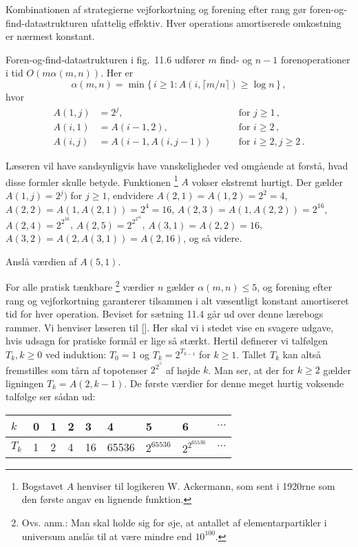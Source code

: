 Kombinationen af strategierne vejforkortning og forening efter rang gør foren-og-find-datastrukturen ufattelig effektiv.
Hver operations amortiserede omkostning er nærmest konstant.

\begin{thm}
Foren-og-find-datastrukturen i fig.~11.6 udfører $m$ find- og $n-1$ forenoperationer i tid $O(m\alpha(m,n))$.
Her er
\[ 
  \alpha(m,n) = \min\{\,i\geq 1\colon A(i,\lceil m/n\rceil)\geq \log n\,\}\,,
\]
hvor
  \begin{align*}
    A(1,j)&= 2^j,&\text{for } j\geq 1\,,\\
    A(i,1)&= A(i-1,2),&\text{for } i\geq 2\,,\\
    A(i,j)&=A(i-1,A(i,j-1)) \qquad &\text{for } i\geq 2,j\geq 2\,.
  \end{align*}
\end{thm}

Læseren vil have sandsynligvis have vanskeligheder ved omgående at forstå, hvad disse formler skulle betyde.
Funktionen%
\footnote{Bogstavet $A$ henviser til logikeren W. Ackermann, som sent i 1920rne som den første angav en lignende funktion.}
$A$ vokser ekstremt hurtigt.
Der gælder $A(1,j)=2^j)$ for $j\geq 1$, endvidere $A(2,1)=A(1,2)=2^2=4$, $A(2,2)=A(1,A(2,1))=2^4= 16$, $A(2,3)=A(1,A(2,2)) = 2^{16}$,
$A(2,4)=2^{2^{16}}$, 
$A(2,5)=2^{2^{2^{16}}}$, 
$A(3,1)=A(2,2)=16$,
$A(3,2)=A(2,A(3,1))=A(2,16)$, og så videre.

\begin{exerc}
 Anslå værdien af $A(5,1)$.
\end{exerc}

For alle pratisk tænkbare
\footnote{Ovs. anm.: Man skal holde sig for øje, at antallet af elementarpartikler i universum anslås til at være mindre end $10^{100}$.}
værdier $n$ gælder $\alpha(m,n)\leq 5$, og forening efter rang og vejforkortning garanterer tilsammen i alt væsentligt konstant amortiseret tid for hver operation.
Beviset for sætning 11.4 går ud over denne lærebogs rammer.
Vi henviser læseren til [].
Her skal vi i stedet vise en svagere udgave, hvis udsagn for pratiske formål er lige så stærkt.
Hertil definerer vi talfølgen $T_k, k\geq 0$ ved induktion: 
$T_0=1$ og $T_k= 2^{T_{k-1}}$ for $k\geq 1$.
Tallet $T_k$ kan altså fremstilles som tårn af topotenser $2^{2^{\vdots^2}}$ af højde $k$.
Man ser, at der for $k\geq 2$ gælder ligningen $T_k = A(2,k-1)$.
De første værdier for denne meget hurtig voksende talfølge ser sådan ud:

\medskip
\begin{tabular}{l|lllllllc}
  $k$  & 0 & 1 & 2 & 3 & 4 & 5 & 6 & $\cdots$ \\\midrule
  $T_k$ & 1 & 2 & 4 & 16 & 65536 & $2^{65536}$ & $2^{2^{65536}}$ & $\cdots$
\end{tabular}
\medskip

